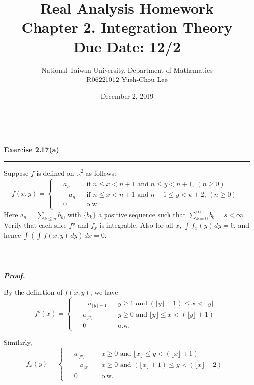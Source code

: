\documentclass[a4paper,11pt]{article}
\title{Real Analysis Homework\\ Chapter 2. Integration Theory\\ Due Date: 12/2}
\author{National Taiwan University, Department of Mathematics\\
R06221012 \hspace{0.2cm} Yueh-Chou Lee}
\date{December 2, 2019}
\begin{document}
\maketitle


\begin{flushleft}
	\rule[-0.5ex]{17cm}{2pt}\\
		\textbf{Exercise 2.17(a)}\\
	\rule[1.5ex]{17cm}{0.5pt}
		Suppose $f$ is defined on $\mathbb{R}^2$ as follows:
			$$f(x, y) = \left\{\begin{matrix}\begin{aligned}
			&a_n &&\text{if }n \leq x < n + 1\text{ and }n \leq y < n + 1,\, (n \geq 0)\\
			&-a_n &&\text{if }n \leq x < n + 1\text{ and }n + 1 \leq y < n + 2,\,(n \geq 0)\\
			&0 &&\text{o.w.}
			\end{aligned}\end{matrix}\right.$$
		Here $a_n = \sum_{k \leq n} b_k$, with $\{b_k\}$ a positive sequence such that $\sum_{k = 0}^\infty b_k = s < \infty$.\\
		\quad Verify that each slice $f^y$ and $f_x$ is integrable. Also for all $x$, $\int\,f_x(y)\,dy = 0$, and hence $\int(\int\,f(x,y)\,dy)\,dx = 0$.
	\rule[1.0ex]{17cm}{0.5pt}\
\end{flushleft}

\textbf{\textit{Proof.}}

By the definition of $f(x, y)$, we have
	$$f^y(x) =
	\left\{\begin{matrix}\begin{aligned}
	&-a_{\lfloor y \rfloor - 1}
	&&y \geq 1\text{ and }(\lfloor y \rfloor - 1) \leq x < \lfloor y \rfloor\\
	&a_{\lfloor y \rfloor}
	&&y \geq 0\text{ and }\lfloor y \rfloor \leq x < (\lfloor y \rfloor + 1)\\
	&0
	&&\text{o.w.}
	\end{aligned}\end{matrix}\right.$$

Similarly,
	$$f_x(y) =
	\left\{\begin{matrix}\begin{aligned}
	&a_{\lfloor x \rfloor}
	&&x \geq 0\text{ and } \lfloor x \rfloor \leq y < (\lfloor x \rfloor + 1)\\
	&-a_{\lfloor x \rfloor}
	&&x \geq 0\text{ and }(\lfloor x \rfloor + 1) \leq y < (\lfloor x \rfloor + 2)\\
	&0
	&&\text{o.w.}
	\end{aligned}\end{matrix}\right.$$
\end{document}
